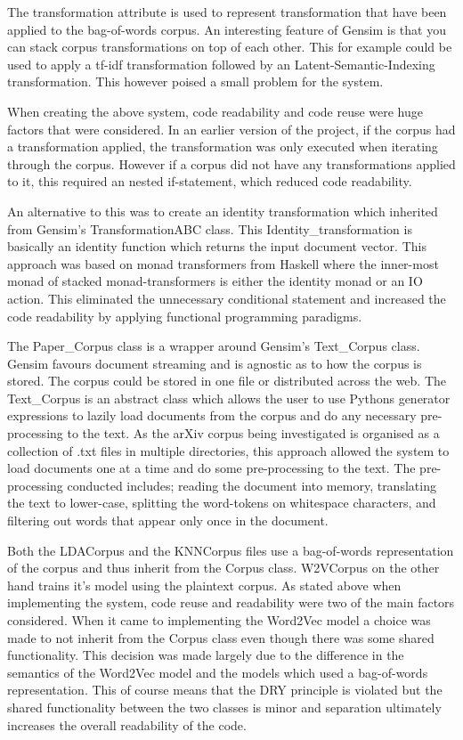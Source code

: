 The transformation attribute is used to represent transformation that have been applied to the bag-of-words corpus.
An interesting feature of Gensim is that you can stack corpus transformations on top of each other.
This for example could be used to apply a tf-idf transformation followed by an Latent-Semantic-Indexing transformation.
This however poised a small problem for the system.

When creating the above system, code readability and code reuse were huge factors that were considered.
In an earlier version of the project, if the corpus had a transformation applied, the transformation was only executed when iterating through the corpus.
However if a corpus did not have any transformations applied to it, this required an nested if-statement, which reduced code readability.

An alternative to this was to create an identity transformation which inherited from Gensim's TransformationABC class.
This Identity\_transformation is basically an identity function which returns the input document vector.
This approach was based on monad transformers from Haskell where the inner-most monad of stacked monad-transformers is either the identity monad or an IO action.
This eliminated the unnecessary conditional statement and increased the code readability by applying functional programming paradigms.

The Paper\_Corpus class is a wrapper around Gensim's Text\_Corpus class.
Gensim favours document streaming and is agnostic as to how the corpus is stored.
The corpus could be stored in one file or distributed across the web.
The Text\_Corpus is an abstract class which allows the user to use Pythons generator expressions to lazily load documents from the corpus and do any necessary pre-processing to the text.
As the arXiv corpus being investigated is organised as a collection of .txt files in multiple directories, this approach allowed the system to load documents one at a time and do some pre-processing to the text.
The pre-processing conducted includes; reading the document into memory, translating the text to lower-case, splitting the word-tokens on whitespace characters, and filtering out words that appear only once in the document.

Both the LDACorpus and the KNNCorpus files use a bag-of-words representation of the corpus and thus inherit from the Corpus class.
W2VCorpus on the other hand trains it's model using the plaintext corpus.
As stated above when implementing the system, code reuse and readability were two of the main factors considered.
When it came to implementing the Word2Vec model a choice was made to not inherit from the Corpus class even though there was some shared functionality.
This decision was made largely due to the difference in the semantics of the Word2Vec model and the models which used a bag-of-words representation.
This of course means that the DRY principle is violated but the shared functionality between the two classes is minor and separation ultimately increases the overall readability of the code.

